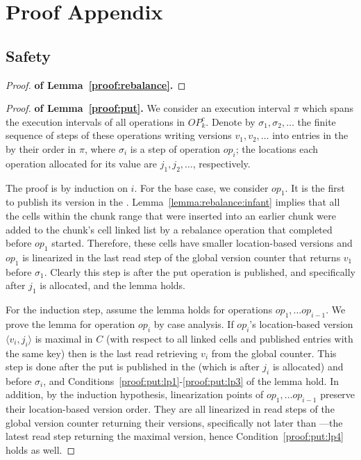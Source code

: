 \section{Proof Appendix}
\label{app:proof}

\subsection{Safety}
\label{app:proof:safety}

\begin{proof} \textbf{of Lemma~\ref{proof:rebalance}.}
\end{proof}

\begin{proof} \textbf{of Lemma~\ref{proof:put}.}
We consider an execution interval $\pi$ which spans the execution intervals of all operations in $OP_k^c$.
Denote by $\sigma_1, \sigma_2, \ldots $ the finite sequence of steps of these operations writing versions $v_1, v_2, \ldots$ into entries in the  by their order in $\pi$, where $\sigma_i$ is a step of operation $op_i$; the locations each operation allocated for its value are $j_1, j_2, \ldots$, respectively.

The proof is by induction on $i$. For the base case, we consider $op_1$. It is the first to publish its version in the . Lemma~\ref{lemma:rebalance:infant} implies that all the cells within the chunk range that were inserted into an earlier chunk were added to the chunk's cell linked list by a rebalance operation that completed before $op_1$ started. Therefore, these cells have smaller location-based versions and $op_1$ is linearized in the last read step of the global version counter that returns $v_1$ before $\sigma_1$. Clearly this step is after the put operation is published, and specifically after $j_1$ is allocated, and the lemma holds.

For the induction step, assume the lemma holds for operations $op_1, \ldots op_{i-1}$. We prove the lemma for operation $op_i$ by case analysis.
If $op_i$'s location-based version $\langle v_i, j_i\rangle$ is maximal in $C$ (with respect to all linked cells and published entries with the same key) then  is the last read retrieving $v_i$ from the global counter. This step is done after the put is published in the  (which is after $j_i$ is allocated) and before $\sigma_i$, and Conditions~\ref{proof:put:lp1}-\ref{proof:put:lp3} of the lemma hold. In addition, by the induction hypothesis, linearization points of $op_1, \ldots op_{i-1}$ preserve their location-based version order. They are all linearized in read steps of the global version counter returning their versions, specifically not later than ---the latest read step returning the maximal version, hence Condition~\ref{proof:put:lp4} holds as well.


\end{proof}
